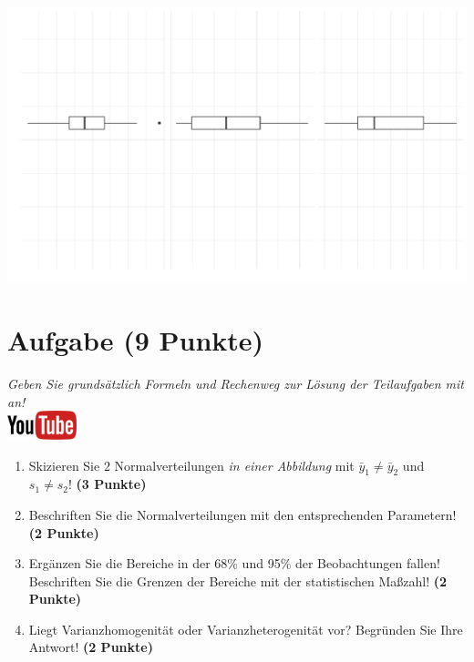 \documentclass[a4paper, 9pt]{scrartcl}\usepackage[]{graphicx}\usepackage[]{xcolor}
\makeatletter
\def\maxwidth{ %
  \ifdim\Gin@nat@width>\linewidth
    \linewidth
  \else
    \Gin@nat@width
  \fi
}
\makeatother
\begin{document}
{\centering \includegraphics[width=\maxwidth]{img/desc-stat-11-1} 

}




 
\clearpage

\section{Aufgabe \hfill (9 Punkte)}

\textit{Geben Sie grunds{\"a}tzlich Formeln und Rechenweg zur L{\"o}sung der
  Teilaufgaben mit an!} \\[1Ex]

\hfill\href{https://youtu.be/ZrJhn2wPbq4}{\includegraphics[width =
  2cm]{img/youtube}}\\[1Ex]



\begin{enumerate}
\item Skizieren Sie $2$ Normalverteilungen \textit{in einer
    Abbildung} mit $\bar{y}_1 \neq \bar{y}_2$ und $s_1 \neq s_2$! \textbf{(3 Punkte)}
\item Beschriften Sie die Normalverteilungen mit den entsprechenden
  Parametern! \textbf{(2 Punkte)}
\item Erg{\"a}nzen Sie die Bereiche in der 68\% und 95\% der Beobachtungen
  fallen! Beschriften Sie die Grenzen der Bereiche mit der statistischen Ma{\ss}zahl! \textbf{(2 Punkte)}
\item Liegt Varianzhomogenit{\"a}t oder Varianzheterogenit{\"a}t vor? Begr{\"u}nden Sie
  Ihre Antwort! \textbf{(2 Punkte)}
\end{enumerate}
\end{document}
